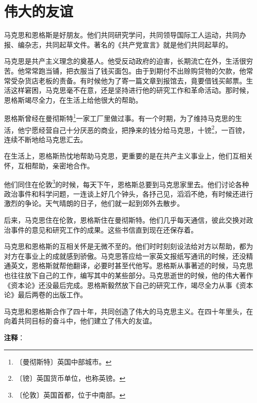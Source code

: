 \documentclass[12pt,UTF-8,openany]{ctexbook}
\begin{document}
\chapter{伟大的友谊}

\begin{large}
    
    马克思和恩格斯是好朋友。他们共同研究学问，共同领导国际工人运动，共同办报、编杂志，共同起草文件。著名的《共产党宣言》就是他们共同起草的。
    
    马克思是共产主义理念的奠基人。他受反动政府的迫害，长期流亡在外，生活很穷苦。他常常跑当铺，把衣服当了钱买面包。由于到期付不出赊购贷物的欠款，他常常受杂货店老板的责备。有时候他为了寄一篇文章到报馆去，竟要借钱买邮票。生活这样窘困，马克思毫不在意，还是坚持进行他的研究工作和革命活动。那时候，恩格斯竭尽全力，在生活上给他很大的帮助。
    
    恩格斯曾经在曼彻斯特\footnote{〔曼彻斯特〕英国中部城市。}一家工厂里做过事。有一个时期，为了维持马克思的生活，他宁愿经营自己十分厌恶的商业，把挣来的钱分给马克思，十镑\footnote{〔镑〕英国货币单位，也称英镑。}，一百镑，连续不断地给马克思汇去。
    
    在生活上，恩格斯热忱地帮助马克思，更重要的是在共产主义事业上，他们互相关怀，互相帮助，亲密地合作。
    
    他们同住在伦敦\footnote{〔伦敦〕英国首都，位于中南部。}的时候，每天下午，恩格斯总要到马克思家里去。他们讨论各种政治事件和科学问题，一连谈上好几个钟头，各抒己见，滔滔不绝，有时候还进行激烈的争论。天气晴朗的日子，他们就一起到郊外去散步。
    
    后来，马克思住在伦敦，恩格斯住在曼彻斯特。他们几乎每天通信，彼此交换对政治事件的意见和研究工作的成果。这些书信直到现在还保存着。
    
    马克思和恩格斯的互相关怀是无微不至的。他们时时刻刻设法给对方以帮助，都为对方在事业上的成就感到骄傲。马克思答应给一家英文报纸写通讯的时候，还没精通英文，恩格斯就帮他翻译，必要时甚至代他写。恩格斯从事著述的时候，马克思也往往放下自己的工作，编写其中的某些部分。马克思逝世的时候，他的伟大著作《资本论》还没最后完成。恩格斯毅然放下自己的研究工作，竭尽全力从事《资本论》最后两卷的出版工作。
    
    马克思和恩格斯合作了四十年，共同创造了伟大的马克思主义。在四十年里头，在向着共同目标的奋斗中，他们建立了伟大的友谊。
    
\end{large}


\newpage

\textbf{注释}：

\vspace{-1em}
\end{document}
